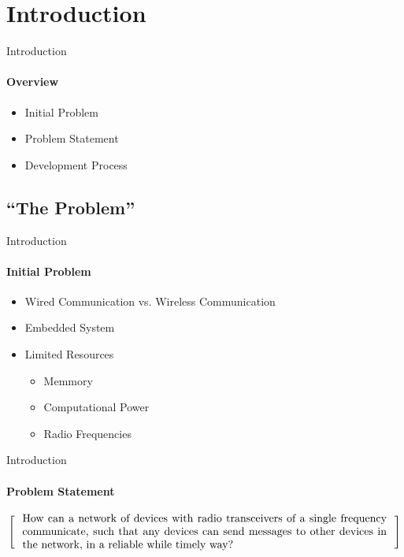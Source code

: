 \section{Introduction}
\begin{frame}{Introduction}\framesubtitle{Overview}
    \begin{itemize}
        \item Initial Problem
        \item Problem Statement
        \item Development Process 
    \end{itemize}
\end{frame}
\subsection{``The Problem''}
\begin{frame}{Introduction}\framesubtitle{Initial Problem}
	\begin{itemize}
        \item Wired Communication vs. Wireless Communication
        \item Embedded System 
        \item Limited Resources
            \begin{itemize}
                \item Memmory
                \item Computational Power
                \item Radio Frequencies
            \end{itemize}
    \end{itemize}

\end{frame}
\begin{frame}{Introduction}\framesubtitle{Problem Statement}
\[
\left[
\begin{minipage}{\textwidth}
\centering
\begin{minipage}{0.96\textwidth}
How can a network of devices with radio transceivers of a single frequency communicate, such that any devices can send messages to other devices in the network, in a reliable while timely way?
\end{minipage}
\end{minipage}
\right]
\]
\end{frame}
